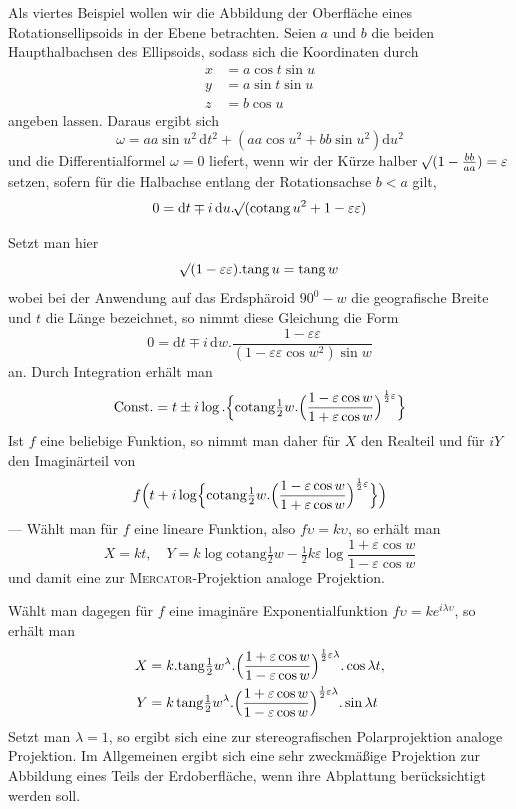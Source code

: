 Als viertes Beispiel wollen wir die Abbildung der Oberfläche eines Rotationsellipsoids in der Ebene betrachten. Seien \(a\) und \(b\) die beiden Haupthalbachsen des Ellipsoids, sodass sich die Koordinaten durch
\[
\begin{aligned}
x&=a\cos t\sin u\\
y&=a\sin t\sin u\\
z&=b\cos u
\end{aligned}
\]
%
\noindent angeben lassen. Daraus ergibt sich
\[
\omega=aa\sin u^2\,\mathrm{d}t^2+(aa\cos u^2+bb\sin u^2)\mathrm{d}u^2
\]
\noindent und die Differentialformel \(\omega=0\) liefert, wenn wir der Kürze halber \(\mathord{{}^{}\!\surd}(1-\frac{bb}{aa})=\varepsilon\) setzen, sofern für die Halbachse entlang der Rotationsachse \(b<a\) gilt,
\[
0=\mathrm{d}t\mp i\,\mathrm{d}u\mathord{.}\mathord{{}^{}\!\surd}(\mathrm{cotang}\,u^2+1-\varepsilon\varepsilon)
\]

Setzt man hier
\[
\mathord{{}^{}\!\surd}(1-\varepsilon\varepsilon)\mathord{.}\mathrm{tang}\,u=\mathrm{tang}\,w
\]
\noindent wobei bei der Anwendung auf das Erdsphäroid \(90^0-w\) die geografische Breite und \(t\) die Länge bezeichnet, so nimmt diese Gleichung die Form
\[
0=\mathrm{d}t\mp i\,\mathrm{d}w\mathord{.}\frac{1-\varepsilon\varepsilon}{(1-\varepsilon\varepsilon\cos w^2)\sin w}
\]
\noindent an. Durch Integration erhält man
\[
\text{Const.}=t\pm i\log\mathord{.}\Bigl\{\mathrm{cotang}\tfrac{1}{2}w\mathord{.}\Bigl(\frac{1-\varepsilon\cos w}{1+\varepsilon\cos w}\Bigr)^{\frac{1}{2}\varepsilon}\Bigr\}
\]
\noindent Ist \(f\) eine beliebige Funktion, so nimmt man daher für \(X\) den Realteil und für \(iY\) den Imaginärteil von
\[
f\Bigl(t+i\log\Bigl\{\mathrm{cotang}\tfrac{1}{2}w\mathord{.}\Bigl(\frac{1-\varepsilon\cos w}{1+\varepsilon\cos w}\Bigr)^{\frac{1}{2}\varepsilon}\Bigr\}\Bigr)
\]
\noindent --- Wählt man für \(f\) eine lineare Funktion, also \(f\upsilon=k\upsilon\), so erhält man
\[
X=kt,\quad Y=k\log\mathrm{cotang}\tfrac{1}{2}w-\tfrac{1}{2}k\varepsilon\log\frac{1+\varepsilon\cos w}{1-\varepsilon\cos w}
\]
\noindent und damit eine zur \textsc{Mercator}-Projektion analoge Projektion.

Wählt man dagegen für \(f\) eine imaginäre Exponentialfunktion \(f\upsilon=ke^{i\lambda\upsilon}\), so erhält man
\[
\begin{aligned}
X&=k\mathord{.}\mathrm{tang}\tfrac{1}{2}w^{\lambda}\mathord{.}\Bigl(\frac{1+\varepsilon\cos w}{1-\varepsilon\cos w}\Bigr)^{\frac{1}{2}\varepsilon\lambda}\mathord{.}\cos\lambda t,\\
Y&=k\,\mathrm{tang}\tfrac{1}{2}w^{\lambda}\mathord{.}\Bigl(\frac{1+\varepsilon\cos w}{1-\varepsilon\cos w}\Bigr)^{\frac{1}{2}\varepsilon\lambda}\mathord{.}\sin\lambda t
\end{aligned}
\]
\noindent Setzt man \(\lambda=1\), so ergibt sich eine zur stereografischen Polarprojektion analoge Projektion. Im Allgemeinen ergibt sich eine sehr zweckmäßige Projektion zur Abbildung eines Teils der Erdoberfläche, wenn ihre Abplattung berücksichtigt werden soll.

